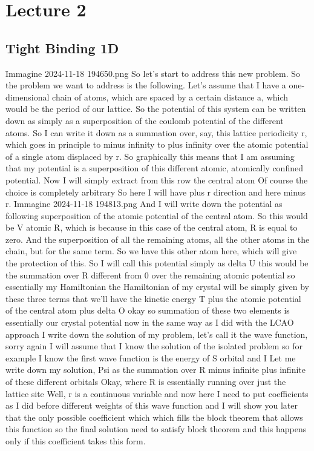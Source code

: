 \chapter{Lecture 2}
\section{Tight Binding 1D}
\f{Immagine 2024-11-18 194650.png}
So let's start to address this new problem. So the problem we want to address is the following. Let's assume that I have a one-dimensional chain of atoms, which are spaced by a certain distance a, which would be the period of our lattice. So the potential of this system can be written down as simply as a superposition of the coulomb potential of the different atoms. So I can write it down as a summation over, say, this lattice periodicity r, which goes in principle to minus infinity to plus infinity over the atomic potential of a single atom displaced by r. So graphically this means that I am assuming that my potential is a superposition of this different atomic, atomically confined potential. Now I will simply extract from this row the central atom Of course the choice is completely arbitrary So here I will have plus r direction and here minus r.
\f{Immagine 2024-11-18 194813.png}
And I will write down the potential as following superposition of the atomic potential of the central atom. So this would be V atomic R, which is because in this case of the central atom, R is equal to zero. And the superposition of all the remaining atoms, all the other atoms in the chain, but for the same term. So we have this other atom here, which will give the protection of this. So I will call this potential simply as delta U this would be the summation over R different from 0 over the remaining atomic potential so essentially my Hamiltonian the Hamiltonian of my crystal will be simply given by these three terms that we'll have the kinetic energy T plus the atomic potential of the central atom plus delta O okay so summation of these two elements is essentially our crystal potential now in the same way as I did with the LCAO approach I write down the solution of my problem, let's call it the wave function, sorry again I will assume that I know the solution of the isolated problem so for example I know the first wave function is the energy of S orbital and I Let me write down my solution, Psi as the summation over R minus infinite plus infinite of these different orbitals Okay, where R is essentially running over just the lattice site Well, r is a continuous variable and now here I need to put coefficients as I did before different weights of this wave function and I will show you later that the only possible coefficient which which fills the block theorem that allows this function so the final solution need to satisfy block theorem and this happens only if this coefficient takes this form.
